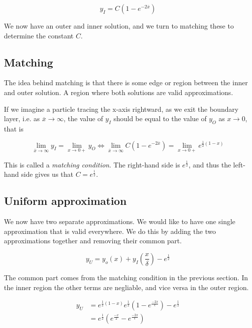 \documentclass[12pt]{article}
\begin{document}
\begin{equation}
y_I = C(1 - e^{-2\overline{x}})
\end{equation}

We now have an outer and inner solution, and we turn to matching these to
determine the constant $C$.

\subsection{Matching}

The idea behind matching is that there is some edge or region between the inner
and outer solution. A region where both solutions are valid approximations.

If we imagine a particle tracing the x-axis rightward, as we exit the boundary
layer, i.e. as $\overline{x} \to \infty$, the value of $y_I$ should be equal to
the value of $y_O$ as $x \to 0$, that is

\begin{equation}
\lim_{\overline{x} \to \infty} y_I = \lim_{x\to 0+} y_O \iff 
\lim_{\overline{x} \to \infty} C(1 - e^{-2\overline{x}}) = \lim_{x \to 0+} e^{\frac{1}{2}(1-x)}
\end{equation}

This is called a \textit{matching condition}. The right-hand side is
$e^{\frac{1}{2}}$, and thus the left-hand side gives us that $C =
e^{\frac{1}{2}}$.

\subsection{Uniform approximation}

We now have two separate approximations. We would like to have one single
approximation that is valid everywhere. We do this by adding the two
approximations together and removing their common part.

\begin{equation}
y_U = y_o(x) + y_I(\frac{x}{\delta}) - e^{\frac{1}{2}}
\end{equation}

The common part comes from the matching condition in the previous section. In
the inner region the other terms are negliable, and vice versa in the outer
region.

\begin{align}
y_U &= e^{\frac{1}{2}(1-x)} e^{\frac{1}{2}}(1 - e^{\frac{-2x}{\epsilon}}) -
e^{\frac{1}{2}} \\
    &=  e^{\frac{1}{2}}(e^{\frac{-x}{2}} - e^{\frac{-2x}{\epsilon}})
\end{align}
\end{document}
